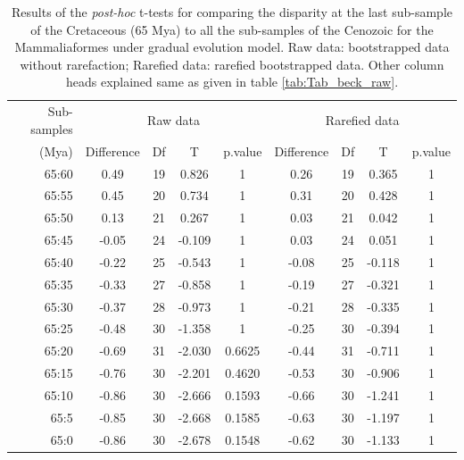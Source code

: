 \documentclass[12pt,letterpaper]{article}
\begin{document}
\begin{table}[ht]
\caption{Results of the \textit{post-hoc} t-tests for comparing the disparity at the last sub-sample of the Cretaceous (65 Mya) to all the sub-samples of the Cenozoic for the Mammaliaformes \citep[data from][]{Slater2012MEE} under gradual evolution model. Raw data: bootstrapped data without rarefaction; Rarefied data: rarefied bootstrapped data. Other column heads explained same as given in table \ref{tab:Tab_beck_raw}.}
\label{tab:Tab_slater}
\centering
\begin{tabular}{r|cccc|cccc}
  \hline
  Sub-samples & \multicolumn{4}{c|}{Raw data} & \multicolumn{4}{c}{Rarefied data} \\
  (Mya) & Difference & Df & T & p.value & Difference & Df & T & p.value \\ 
  \hline
  65:60 & 0.49  & 19 & 0.826  & 1      & 0.26  & 19 & 0.365  & 1 \\ 
  65:55 & 0.45  & 20 & 0.734  & 1      & 0.31  & 20 & 0.428  & 1 \\ 
  65:50 & 0.13  & 21 & 0.267  & 1      & 0.03  & 21 & 0.042  & 1 \\ 
  65:45 & -0.05 & 24 & -0.109 & 1      & 0.03  & 24 & 0.051  & 1 \\ 
  65:40 & -0.22 & 25 & -0.543 & 1      & -0.08 & 25 & -0.118 & 1 \\ 
  65:35 & -0.33 & 27 & -0.858 & 1      & -0.19 & 27 & -0.321 & 1 \\ 
  65:30 & -0.37 & 28 & -0.973 & 1      & -0.21 & 28 & -0.335 & 1 \\ 
  65:25 & -0.48 & 30 & -1.358 & 1      & -0.25 & 30 & -0.394 & 1 \\ 
  65:20 & -0.69 & 31 & -2.030 & 0.6625 & -0.44 & 31 & -0.711 & 1 \\ 
  65:15 & -0.76 & 30 & -2.201 & 0.4620 & -0.53 & 30 & -0.906 & 1 \\ 
  65:10 & -0.86 & 30 & -2.666 & 0.1593 & -0.66 & 30 & -1.241 & 1 \\ 
  65:5  & -0.85 & 30 & -2.668 & 0.1585 & -0.63 & 30 & -1.197 & 1 \\ 
  65:0  & -0.86 & 30 & -2.678 & 0.1548 & -0.62 & 30 & -1.133 & 1 \\ 
   \hline
\end{tabular}
\end{table}

%
%
\end{document}
